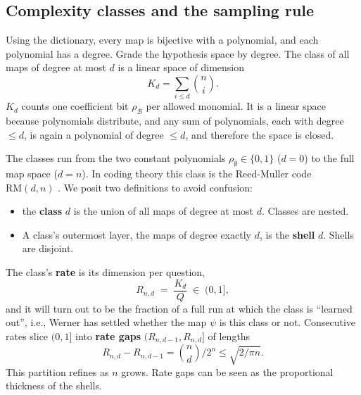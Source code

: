 \documentclass[11pt]{article}
\begin{document}
\subsection{Complexity classes and the sampling rule}

Using the dictionary, every map is bijective with a polynomial, and each polynomial has a degree.
Grade the hypothesis space by degree. The class of all maps of degree
at most $d$ is a linear space of dimension
%
\begin{equation}
K_d = \sum_{i \le d} \binom ni.
\end{equation}
$K_d$ counts one coefficient bit $\rho_{\mathcal B}$ per allowed
monomial. It is a linear space because polynomials distribute, and any sum of polynomials, each with degree $\le d$, is again
a polynomial of degree $\le d$, and therefore the space is closed.

The classes run from the two constant polynomials $\rho_\emptyset \in \{0,1\}$
($d = 0$) to the full map space ($d = n$). In coding theory this
class is the Reed-Muller code $\mathrm{RM}(d,n)$ \cite{macwilliams}. We posit two definitions to avoid confusion:
\begin{itemize}
\item the \textbf{class} $d$ is the union of all maps of degree at
most $d$. Classes are nested.
\item A class's outermost layer, the maps of degree
exactly $d$, is the \textbf{shell} $d$. Shells are disjoint. 
\end{itemize} 
The class's \textbf{rate}
is its dimension per question,
%
\begin{equation}
  R_{n,d} \;=\; \frac{K_d}{Q} \;\in\; (0,1],
  \label{eq:rmrate}
\end{equation}
%
and it will turn out to be the fraction of a full run at which the
class is ``learned out'', i.e., Werner has settled whether the map $\psi$ is this class or not. 
Consecutive rates slice $(0,1]$ into
\textbf{rate gaps} $(R_{n,d-1}, R_{n,d}]$ of lengths
%
\begin{equation}
  R_{n,d} - R_{n,d-1} = \binom nd / 2^n \le \sqrt{2/\pi n}.
  \label{eq:rategap}
\end{equation}
This partition refines as $n$ grows. Rate gaps can be seen as the proportional thickness of the shells.
\end{document}
